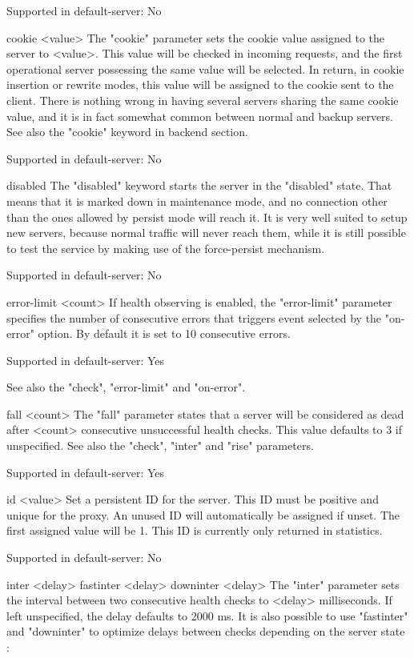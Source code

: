   Supported in default-server: No

cookie <value>
  The "cookie" parameter sets the cookie value assigned to the server to
  <value>. This value will be checked in incoming requests, and the first
  operational server possessing the same value will be selected. In return, in
  cookie insertion or rewrite modes, this value will be assigned to the cookie
  sent to the client. There is nothing wrong in having several servers sharing
  the same cookie value, and it is in fact somewhat common between normal and
  backup servers. See also the "cookie" keyword in backend section.

  Supported in default-server: No

disabled
  The "disabled" keyword starts the server in the "disabled" state. That means
  that it is marked down in maintenance mode, and no connection other than the
  ones allowed by persist mode will reach it. It is very well suited to setup
  new servers, because normal traffic will never reach them, while it is still
  possible to test the service by making use of the force-persist mechanism.

  Supported in default-server: No

error-limit <count>
  If health observing is enabled, the "error-limit" parameter specifies the
  number of consecutive errors that triggers event selected by the "on-error"
  option. By default it is set to 10 consecutive errors.

  Supported in default-server: Yes

  See also the "check", "error-limit" and "on-error".

fall <count>
  The "fall" parameter states that a server will be considered as dead after
  <count> consecutive unsuccessful health checks. This value defaults to 3 if
  unspecified. See also the "check", "inter" and "rise" parameters.

  Supported in default-server: Yes

id <value>
  Set a persistent ID for the server. This ID must be positive and unique for
  the proxy. An unused ID will automatically be assigned if unset. The first
  assigned value will be 1. This ID is currently only returned in statistics.

  Supported in default-server: No

inter <delay>
fastinter <delay>
downinter <delay>
  The "inter" parameter sets the interval between two consecutive health checks
  to <delay> milliseconds. If left unspecified, the delay defaults to 2000 ms.
  It is also possible to use "fastinter" and "downinter" to optimize delays
  between checks depending on the server state :


